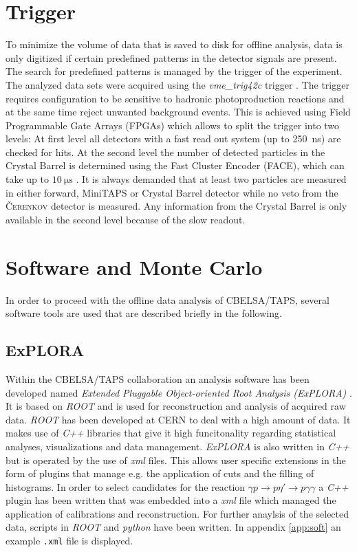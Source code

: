 \section{Trigger}
\label{sec:trig}
To minimize the volume of data that is saved to disk for offline analysis, data is only digitized if certain predefined patterns in the detector signals are present. The search for predefined patterns is managed by the trigger of the experiment. The analyzed data sets were acquired using the \emph{vme\_trig42c} trigger \cite{trig1,trig2}. The trigger requires configuration to be sensitive to hadronic photoproduction reactions and at the same time reject unwanted background events. This is achieved using Field Programmable Gate Arrays (FPGAs) which allows to split the trigger into two levels: At first level all detectors with a fast read out system (up to \SI{250}{\nano\s}) are checked for hits. At the second level the number of detected particles in the Crystal Barrel is determined using the Fast Cluster Encoder (FACE), which can take up to $\SI{10}{\micro\s}$ \cite{face}. It is always demanded that at least two particles are measured in either forward, MiniTAPS or Crystal Barrel detector while no veto from the \textsc{\v Cerenkov} detector is measured. Any information from the Crystal Barrel is only available in the second level because of the slow readout.
\section{Software and Monte Carlo}
\label{sec:mc}
In order to proceed with the offline data analysis of CBELSA/TAPS, several software tools are used that are described briefly in the following.
\subsection{ExPLORA}
Within the CBELSA/TAPS collaboration an analysis software has been developed named \emph{Extended Pluggable Object-oriented Root Analysis (ExPLORA)} \cite{explora}. It is based on \emph{ROOT} \cite{root} and is used for reconstruction and analysis of acquired raw data. \emph{ROOT} has been developed at CERN to deal with a high amount of data. It makes use of \emph{C++} libraries that give it high funcitonality regarding statistical analyses, visualizations and data management. \emph{ExPLORA} is also written in \emph{C++} but is operated by the use of \emph{xml} files. This allows user specific extensions in the form of plugins that manage e.g. the application of cuts and the filling of histograms. In order to select candidates for the reaction $\gamma p\to p\eta'\to p\gamma\gamma$ a \emph{C++} plugin has been written that was embedded into a \emph{xml} file which managed the application of calibrations and reconstruction. For further anaylsis of the selected data, scripts in \emph{ROOT} and \emph{python} have been written. In appendix \ref{app:soft} an example \texttt{.xml} file is displayed.
